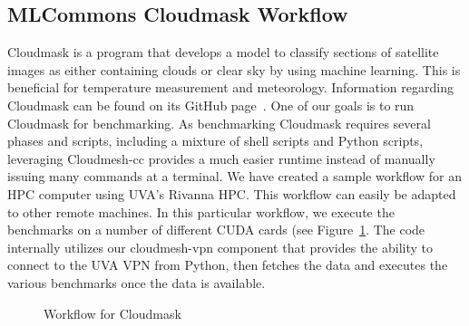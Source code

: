 
\subsection{MLCommons Cloudmask Workflow}
\label{cloudmask-workflow}

Cloudmask is a program that develops a model to classify sections of
satellite images as either containing clouds or clear sky by using
machine learning. This is beneficial for temperature measurement and
meteorology.  Information regarding Cloudmask can be found on its
GitHub page~\cite{www-cloudmask}.
One of our goals is to run Cloudmask for benchmarking.
As benchmarking Cloudmask requires
several phases and scripts, including a mixture of shell scripts and
Python scripts, leveraging Cloudmesh-cc provides a much easier runtime
instead of manually issuing many commands at a terminal.
We have created a sample workflow for an HPC
computer using UVA's Rivanna HPC. 
This workflow can easily be adapted to other remote machines. In this
particular workflow, we execute the benchmarks on a number of different
CUDA cards (see Figure~\ref{fig:cloudmaskwf}. The code internally utilizes
our cloudmesh-vpn component that provides the ability to
connect to the UVA VPN from Python, then fetches the data and executes
the various benchmarks once the data is available.



\begin{figure}[htb]
  \vspace{-1cm}
  \caption{Workflow for Cloudmask}\label{fig:cloudmaskwf}
\end{figure}


